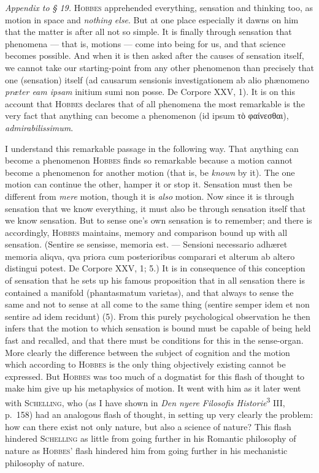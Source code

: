 \documentclass[12pt]{book}
\newcommand{\opage}[1]{\marginnote{\footnotesize\textit{[#1]}}}
\begin{document}
\textit{Appendix to § 19.} \textsc{Hobbes} apprehended everything, sensation and
thinking too, as motion in space and \textit{nothing else}. But at one place
especially it dawns on him that the matter is after all not so simple. It is
finally through sensation that phenomena --- that is, motions --- come into being
for us, and that science becomes possible. And when it is then asked after the
causes of sensation itself, we cannot take our starting-point from any other
phenomenon than precisely that one (sensation) itself (ad causarum sensionis
investigationem ab alio phænomeno \textit{præter eam ipsam} initium sumi non
posse. De Corpore XXV, 1). It is on this account that \textsc{Hobbes} declares
that of all phenomena the most remarkable is the very fact that anything can
become a phenomenon (id ipsum τὸ φαίνεσθαι), \textit{admirabilissimum}.

I understand this remarkable passage in the following way. That anything can
become a phenomenon \textsc{Hobbes} finds so remarkable because a motion cannot
become a phenomenon for another motion (that is, be \textit{known} by it). The
one motion can continue the other, hamper it or stop it. Sensation must then be
different from \textit{mere} motion, though it is \textit{also} motion. Now since
it is through sensation that we know everything, it must also be through sensation
itself that we know sensation. But to sense one's own sensation is to remember;
and there is accordingly, \textsc{Hobbes} maintains, memory and comparison bound
up with all sensation. (Sentire se sensisse, memoria est. --- Sensioni necessario
adhæret memoria aliqva, qva priora cum posterioribus comparari et alterum ab
altero distingui potest. De Corpore XXV, 1; 5.) It is in consequence of this
\opage{118}conception of sensation that he sets up his famous proposition that in all
sensation there is contained a manifold (phantasmatum varietas), and that always
to sense the same and not to sense at all come to the same thing (sentire semper
idem et non sentire ad idem recidunt) (5). From this purely psychological
observation he then infers that the motion to which sensation is bound must be
capable of being held fast and recalled, and that there must be conditions for
this in the sense-organ. More clearly the difference between the subject of
cognition and the motion which according to \textsc{Hobbes} is the only thing
objectively existing cannot be expressed. But \textsc{Hobbes} was too much of a
dogmatist for this flash of thought to make him give up his metaphysics of motion.
It went with him as it later went with \textsc{Schelling}, who (as I have shown in
\textit{Den nyere Filosofis Historie}\textsuperscript{3} III, p.\ 158) had an
analogous flash of thought, in setting up very clearly the problem: how can there
exist not only nature, but also a science of nature? This flash hindered
\textsc{Schelling} as little from going further in his Romantic philosophy of
nature as \textsc{Hobbes}' flash hindered him from going further in his
mechanistic philosophy of nature.
\end{document}
